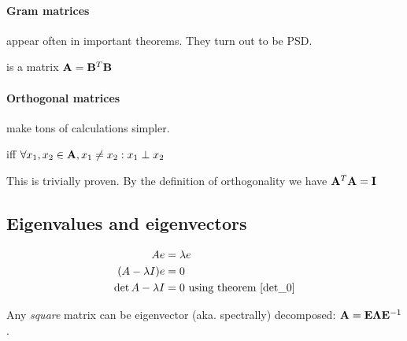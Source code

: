 \paragraph{Gram matrices} appear often in important theorems. They turn out to be PSD.
\begin{definition}
     is a matrix $\mathbf{A} = \mathbf{B}^T \mathbf{B}$
\end{definition}

\begin{theorem}
    [$\rank{A} = \rank{A^T A}$]
\end{theorem}

\begin{theorem}
    [$A^T A: \PSD$]
\end{theorem}


\paragraph{Orthogonal matrices} make tons of calculations simpler.
\begin{definition} iff $\forall x_1, x_2 \in \mathbf{A}, x_1 \neq x_2: x_1 \perp x_2$
\end{definition}

\begin{theorem}
    [If $A$ is orthogonal, than $A^{-1} = A^T$.]
    This is trivially proven. By the definition of orthogonality we have $\mathbf{A}^T \mathbf{A} = \mathbf{I}$
\end{theorem}








\subsection{Eigenvalues and eigenvectors}

\begin{equation}
    \begin{aligned}
        A e &= \lambda e \\
        ( A - \lambda I ) e &= 0 \\
        \det{A - \lambda I} &= 0 \text{ using theorem \ref{det_0}}
    \end{aligned}
\end{equation}

Any \emph{square} matrix can be eigenvector (aka. spectrally) decomposed: $\mathbf{A} = \mathbf{E} \mathbf{\Lambda}\mathbf{E}^{-1}$.



